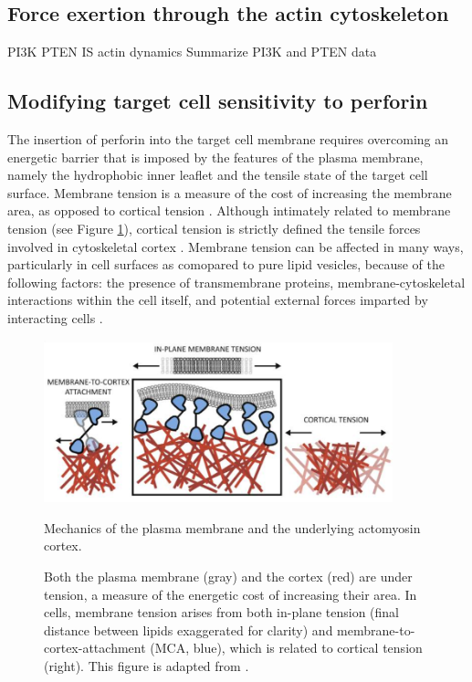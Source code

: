 \subsection{Force exertion through the actin cytoskeleton}

PI3K PTEN IS actin dynamics
Summarize PI3K and PTEN data

\subsection{Modifying target cell sensitivity to perforin}
The insertion of perforin into the target cell membrane requires overcoming an energetic barrier that is imposed by the features of the plasma membrane, namely the hydrophobic inner leaflet and the tensile state of the target cell surface. Membrane tension is a measure of the cost of increasing the membrane area, as opposed to cortical tension \cite{Sitarska2020}. Although intimately related to membrane tension (see Figure \ref{fig:membranecorticaltension}), cortical tension is strictly defined the tensile forces involved in cytoskeletal cortex \cite{Sitarska2020}. Membrane tension can be affected in many ways, particularly in cell surfaces as comopared to pure lipid vesicles, because of the following factors: the presence of transmembrane proteins, membrane-cytoskeletal interactions within the cell itself, and potential external forces imparted by interacting cells \cite{Sitarska2020}. 

\begin{figure}[htbp]
	\centering
	\includegraphics[width=0.9\textwidth]{../figures/chapter2/membranecorticaltension.png}
	\caption{Mechanics of the plasma membrane and the underlying actomyosin cortex.}
	\caption*{Both the plasma membrane (gray) and the cortex (red) are under tension, a measure of the energetic cost of increasing their area. In cells, membrane tension arises from both in-plane tension (final distance between lipids exaggerated for clarity) and membrane-to-cortex-attachment (MCA, blue), which is related to cortical tension (right). This figure is adapted from \cite{Sitarska2020}.}
	\label{fig:membranecorticaltension}
\end{figure}

